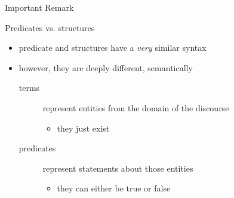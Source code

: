 \documentclass[presentation]{beamer}\mode<presentation>{\usetheme{AMSBolognaFC}}
\begin{document}
\begin{frame}{Important Remark}
    \begin{alertblock}{Predicates vs. structures}
        \begin{itemize}
            \item predicate and structures have a \emph{very} similar \alert{syntax}
            \item however, they are deeply different, \alert{semantically}
            \begin{description}
                \item[terms] represent entities from the domain of the discourse
                \begin{itemize}
                    \item they just exist
                \end{itemize}

                \item[predicates] represent statements about those entities
                \begin{itemize}
                    \item they can either be true or false
                \end{itemize}
            \end{description}
        \end{itemize}
    \end{alertblock}
\end{frame}
\end{document}

